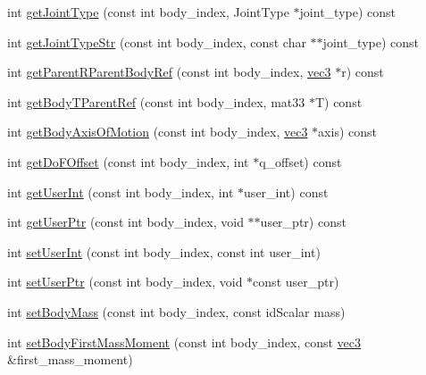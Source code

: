 \begin{CompactItemize}
\item 
int \hyperlink{classbt_inverse_dynamics_1_1_multi_body_tree_364bd17e226b15ab6615de4bf8de110d}{getJointType} (const int body\_\-index, JointType $\ast$joint\_\-type) const 
\item 
int \hyperlink{classbt_inverse_dynamics_1_1_multi_body_tree_6591655d73601c531baed6121f89add5}{getJointTypeStr} (const int body\_\-index, const char $\ast$$\ast$joint\_\-type) const 
\item 
int \hyperlink{classbt_inverse_dynamics_1_1_multi_body_tree_d7b1596a98a55cd32c3af072a82dcade}{getParentRParentBodyRef} (const int body\_\-index, \hyperlink{classbt_inverse_dynamics_1_1vec3}{vec3} $\ast$r) const 
\item 
int \hyperlink{classbt_inverse_dynamics_1_1_multi_body_tree_3781cd90824117bc9f483b4f13b26f1c}{getBodyTParentRef} (const int body\_\-index, mat33 $\ast$T) const 
\item 
int \hyperlink{classbt_inverse_dynamics_1_1_multi_body_tree_07d19dbfe7c35c0b455b7d58e9f4b014}{getBodyAxisOfMotion} (const int body\_\-index, \hyperlink{classbt_inverse_dynamics_1_1vec3}{vec3} $\ast$axis) const 
\item 
int \hyperlink{classbt_inverse_dynamics_1_1_multi_body_tree_fd9a288177719c951a7b851a6491f308}{getDoFOffset} (const int body\_\-index, int $\ast$q\_\-offset) const 
\item 
int \hyperlink{classbt_inverse_dynamics_1_1_multi_body_tree_65a04485f338b3c3c1ace010d460a453}{getUserInt} (const int body\_\-index, int $\ast$user\_\-int) const 
\item 
int \hyperlink{classbt_inverse_dynamics_1_1_multi_body_tree_32df6e169921b17d1bce944dc83918e9}{getUserPtr} (const int body\_\-index, void $\ast$$\ast$user\_\-ptr) const 
\item 
int \hyperlink{classbt_inverse_dynamics_1_1_multi_body_tree_f93f698a6d22d8f735f162c326649342}{setUserInt} (const int body\_\-index, const int user\_\-int)
\item 
int \hyperlink{classbt_inverse_dynamics_1_1_multi_body_tree_d2c37fb7a6cb73b1af87e0b7884717c0}{setUserPtr} (const int body\_\-index, void $\ast$const user\_\-ptr)
\item 
int \hyperlink{classbt_inverse_dynamics_1_1_multi_body_tree_aec1f7c8093f74529f49e7b36bc59ed7}{setBodyMass} (const int body\_\-index, const idScalar mass)
\item 
int \hyperlink{classbt_inverse_dynamics_1_1_multi_body_tree_5d8c853cf45160f049977e16175fa288}{setBodyFirstMassMoment} (const int body\_\-index, const \hyperlink{classbt_inverse_dynamics_1_1vec3}{vec3} \&first\_\-mass\_\-moment)

\end{CompactItemize}
